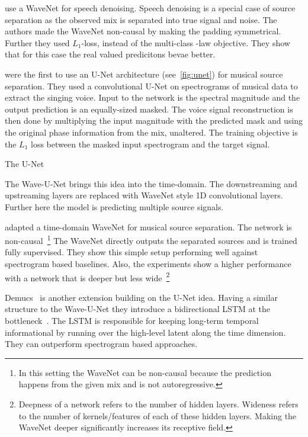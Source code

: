 \textcite{rethageWavenet2018} use a WaveNet for speech denoising. Speech denoising is a special case of source separation as the observed mix is separated into true signal and noise. The authors made the WaveNet non-causal by making the padding symmetrical. Further they used \(L_1\)-loss, instead of the multi-class \μ-law objective. They show that for this case the real valued predicitons bevae better.

\textcite{janssonSinging2017} were the first to use an U-Net architecture (see~\cref{fig:unet}) for musical source separation. They used a convolutional U-Net on spectrograms of musical data to extract the singing voice. Input to the network is the spectral magnitude and the output prediction is an equally-sized masked. The voice signal reconstruction is then done by multiplying the input magnitude with the predicted mask and using the original phase information from the mix, unaltered. The training objective is the \(L_1\) loss between the masked input spectrogram and the target signal.

\begin{marginfigure}
    \caption{The U-Net}%
    \label{fig:unet}
\end{marginfigure}

The Wave-U-Net\cite{stollerWaveUNet2018} brings this idea into the time-domain. The downstreaming and upstreaming layers are replaced with WaveNet style 1D convolutional layers. Further here the model is predicting multiple source signals.

\textcite{lluisEndtoend2019} adapted a time-domain WaveNet for musical source separation. The network is non-causal~\footnote{In this setting the WaveNet can be non-causal because the prediction happens from the given mix and is not autoregressive.} The WaveNet directly outputs the separated sources and is trained fully supervised. They show this simple setup performing well against spectrogram based baselines. Also, the experiments show a higher performance with a network that is deeper but less wide~\footnote{Deepness of a network refers to the number of hidden layers. Wideness refers to the number of kernels/features of each of these hidden layers. Making the WaveNet deeper significantly increases its receptive field.}

Demucs~\cite{defossezDemucs2019} is another extension building on the U-Net idea. Having a similar structure to the Wave-U-Net they introduce a bidirectional LSTM at the bottleneck~\cite{defossezSING2018}. The LSTM is responsible for keeping long-term temporal informational by running over the high-level latent along the time dimension. They can outperform spectrogram based approaches.
